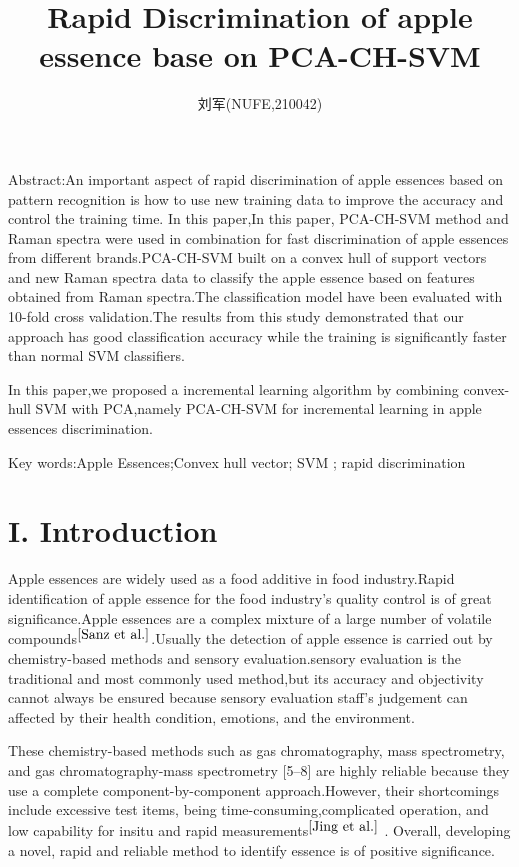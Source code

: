 \documentclass[a4paper]{article}
\author{刘军(NUFE,210042)}
\date{}
\title{Rapid Discrimination of apple essence base on PCA-CH-SVM  }
\begin{document}
\maketitle

Abstract:An important aspect of rapid discrimination of apple essences based on pattern recognition is how to use new training data to improve the accuracy and control the training time. In this paper,In this paper, PCA-CH-SVM method and Raman spectra were used in combination for fast discrimination of apple essences from different brands.PCA-CH-SVM built on a convex hull of support vectors and new Raman spectra data to classify the apple essence based on features obtained from Raman spectra.The classification model have been evaluated with 10-fold cross validation.The results from this study demonstrated that our approach has good classiﬁcation accuracy while the training is signiﬁcantly faster than normal SVM classiﬁers.

In this paper,we proposed a incremental learning algorithm by combining convex-hull SVM with PCA,namely PCA-CH-SVM for incremental learning in apple essences discrimination.

Key words:Apple Essences;Convex hull vector; SVM ; rapid discrimination
\section{I. Introduction}
Apple essences are widely used as a food additive in food industry.Rapid identification of apple essence for the food industry's quality control is of great significance.Apple essences are a complex mixture of a large number of volatile compounds$^{\cite{Sanz et al.}}$.Usually the detection of apple essence is carried out by chemistry-based methods and sensory evaluation.sensory evaluation is the traditional and most commonly used method,but its accuracy and objectivity cannot always be ensured because sensory evaluation staff’s judgement can affected by their health condition, emotions, and the environment.

These chemistry-based methods such as gas chromatography, mass spectrometry, and gas chromatography-mass spectrometry [5–8] are highly reliable because they use a complete component-by-component approach.However, their shortcomings include excessive test items, being time-consuming,complicated operation, and low capability for insitu and rapid measurements$^{\cite{Jing et al.}}$ . Overall, developing a novel, rapid and reliable method to identify  essence is of positive significance.
\end{document}
